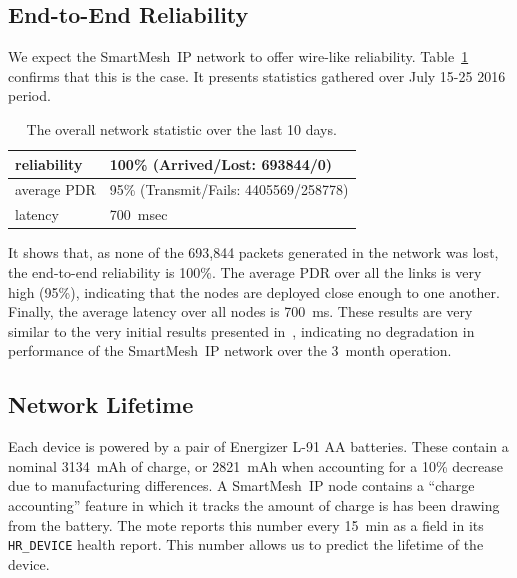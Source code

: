 \documentclass{sig-alternate}
\newcommand{\smip}                {SmartMesh~IP\xspace}
\newcommand{\HRDEVICE}            {{\tt HR\_DEVICE}\xspace}
\begin{document}
\subsection{End-to-End Reliability}
\label{sec:net_reliability}


We expect the \smip network to offer wire-like reliability.
Table~\ref{tab:net_stats} confirms that this is the case.
It presents statistics gathered over July 15-25 2016 period.

\begin{table}
    \begin{tabular}{|l|l|}
        \hline
        reliability & 100\% (Arrived/Lost:   693844/0)\\ \hline
        average PDR & 95\% (Transmit/Fails: 4405569/258778)\\ \hline
        latency     & 700~msec\\
        \hline
    \end{tabular}
    \caption{The overall network statistic over the last 10 days.}
    \label{tab:net_stats}
\end{table}

It shows that, as none of the 693,844 packets generated in the network was lost, the end-to-end reliability is 100\%.
The average PDR over all the links is very high (95\%), indicating that the nodes are deployed close enough to one another.
Finally, the average latency over all nodes is 700~ms.
These results are very similar to the very initial results presented in~\cite{watteyne16peach}, indicating no degradation in performance of the \smip network over the 3~month operation.

\subsection{Network Lifetime}
\label{sec:lifetime}


Each device is powered by a pair of Energizer L-91 AA batteries.
These contain a nominal 3134~mAh of charge, or 2821~mAh when accounting for a 10\% decrease due to manufacturing differences.
A \smip node contains a ``charge accounting'' feature in which it tracks the amount of charge is has been drawing from the battery.
The mote reports this number every 15~min as a field in its \HRDEVICE health report.
This number allows us to predict the lifetime of the device.
\end{document}
